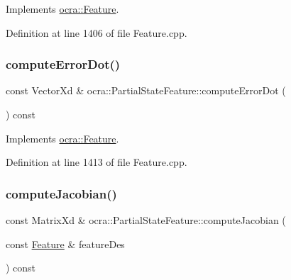 Implements \hyperlink{classocra_1_1Feature_ac714181e1bb25f878349e299c4ba8c00}{ocra\+::\+Feature}.



Definition at line 1406 of file Feature.\+cpp.

\hypertarget{classocra_1_1PartialStateFeature_a946499ed311c24cb0cd9953b51b7d170}{}\label{classocra_1_1PartialStateFeature_a946499ed311c24cb0cd9953b51b7d170} 
\subsubsection{\texorpdfstring{compute\+Error\+Dot()}{computeErrorDot()}\hspace{0.1cm}{\footnotesize\ttfamily [2/2]}}
{\footnotesize\ttfamily const Vector\+Xd \& ocra\+::\+Partial\+State\+Feature\+::compute\+Error\+Dot (\begin{DoxyParamCaption}{ }\end{DoxyParamCaption}) const\hspace{0.3cm}{\ttfamily [virtual]}}



Implements \hyperlink{classocra_1_1Feature_a01a4870418ba87d5b41d8f917c1255fc}{ocra\+::\+Feature}.



Definition at line 1413 of file Feature.\+cpp.

\hypertarget{classocra_1_1PartialStateFeature_a8b70dbff8a1a06f16621d34b3e8bc5cf}{}\label{classocra_1_1PartialStateFeature_a8b70dbff8a1a06f16621d34b3e8bc5cf} 
\subsubsection{\texorpdfstring{compute\+Jacobian()}{computeJacobian()}\hspace{0.1cm}{\footnotesize\ttfamily [1/2]}}
{\footnotesize\ttfamily const Matrix\+Xd \& ocra\+::\+Partial\+State\+Feature\+::compute\+Jacobian (\begin{DoxyParamCaption}\item[{const \hyperlink{classocra_1_1Feature}{Feature} \&}]{feature\+Des }\end{DoxyParamCaption}) const\hspace{0.3cm}{\ttfamily [virtual]}}



